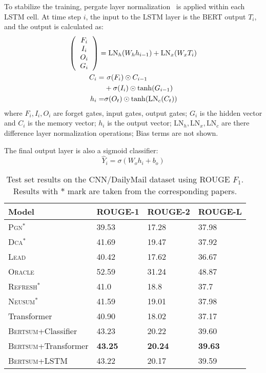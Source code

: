     To stabilize the training,  pergate layer normalization~\cite{ba2016layer} is applied within each LSTM cell. At time step $i$, the input to the LSTM layer is the BERT output $T_i$, and the output is calculated as:
    \begin{gather}
    \left (
    \begin{tabular}{c}
    $F_i$ \\
    $I_i$\\
    $O_i$\\
    $G_i$
    \end{tabular}
    \right )=\mathrm{LN}_h(W_hh_{i-1})+\mathrm{LN}_x(W_xT_i)\\
    \begin{align}
    \nonumber C_i =&~\sigma(F_i)\odot C_{i-1}\\
    &+\sigma(I_i)\odot \mathrm{tanh}(G_{i-1})\\
    h_i = &\sigma(O_t)\odot \mathrm{tanh}(\mathrm{LN}_c(C_t))\end{align}
    \end{gather}
    where  $F_i, I_i, O_i$ are forget gates, input gates, output gates; $G_i$ is the hidden vector and $C_i$ is the memory vector; $h_i$ is the  output vector; $\mathrm{LN}_h, \mathrm{LN}_x, \mathrm{LN}_c$ are there difference layer normalization operations; Bias terms are not shown.
    
    The final output layer is also a sigmoid classifier:
    \begin{equation}
   \hat{Y}_i = \sigma(W_oh_i+b_o)
    \end{equation}
    
                \begin{table*}[htbp]
    \center
    \begin{tabular}{l|lll}
        Model              & ROUGE-1    & ROUGE-2    & ROUGE-L    \\ \hline
        \textsc{Pgn}$^*$  &39.53&17.28&37.98\\

        \textsc{Dca}$^*$  &41.69&19.47&37.92\\\hline
        \textsc{Lead}               & 40.42  & 17.62  & 36.67  \\
                \textsc{Oracle}               & 52.59  & 31.24 & 48.87  \\
        \textsc{Refresh}$^*$              & 41.0  & 18.8 & 37.7  \\
        \textsc{Neusum}$^*$              & 41.59  & 19.01  & 37.98  \\\hline

        Transformer& 40.90 & 18.02  & 37.17  \\
        \textsc{Bertsum}+Classifier  & 43.23  & 20.22 & 39.60\\
        \textsc{Bertsum}+Transformer  & \textbf{43.25}& \textbf{20.24}& \textbf{39.63}\\
        \textsc{Bertsum}+LSTM  & 43.22  & 20.17 & 39.59
    \end{tabular}
    \caption{Test set results on  the CNN/DailyMail  dataset using  ROUGE $F_1$. Results with $*$ mark
        are taken from the corresponding papers.}
\end{table*}

